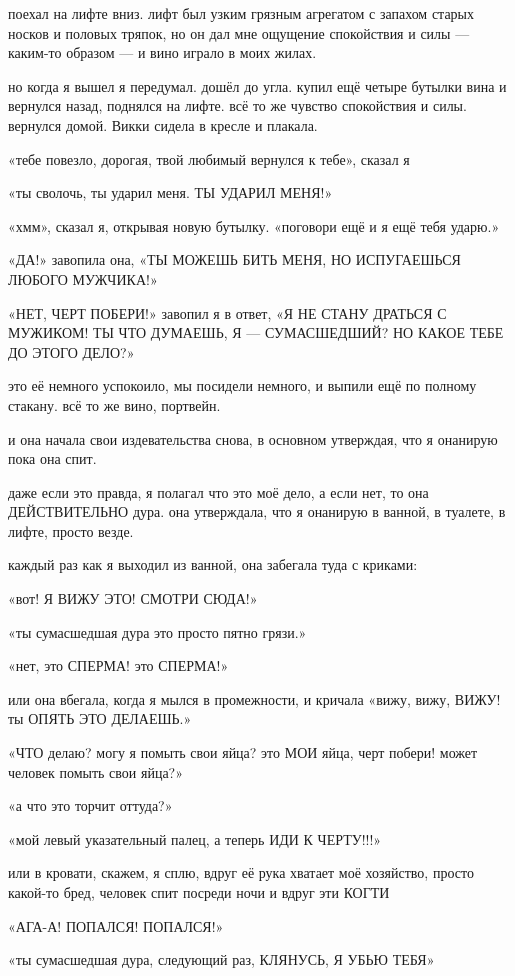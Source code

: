 поехал на лифте вниз.
лифт был узким грязным агрегатом с запахом старых 
носков и половых тряпок, но он дал мне ощущение спокойствия и силы --- каким-то 
образом --- и вино играло в моих жилах.

но когда я вышел я передумал.
дошёл до угла.
купил ещё четыре бутылки вина
и вернулся назад, поднялся на лифте.
всё то же чувство спокойствия и силы.
вернулся домой.
Викки сидела в кресле и плакала.

«тебе повезло, дорогая, твой любимый вернулся к тебе»,  сказал я

«ты сволочь, ты ударил меня.
ТЫ УДАРИЛ МЕНЯ!»

«хмм»,  сказал я, открывая новую бутылку.
«поговори ещё и я ещё тебя ударю.»

«ДА!» завопила она, «ТЫ МОЖЕШЬ БИТЬ МЕНЯ, НО ИСПУГАЕШЬСЯ ЛЮБОГО МУЖЧИКА!»

«НЕТ, ЧЕРТ ПОБЕРИ!» завопил я в ответ, «Я  НЕ  СТАНУ  ДРАТЬСЯ  С МУЖИКОМ! ТЫ  ЧТО ДУМАЕШЬ, Я --- СУМАСШЕДШИЙ?  НО  КАКОЕ ТЕБЕ ДО ЭТОГО ДЕЛО?»

это её немного успокоило, мы посидели немного, и выпили ещё по полному стакану.
всё то же вино, портвейн.

и она начала свои издевательства снова, в основном утверждая, что я онанирую
пока она спит.

даже если это правда, я полагал что это моё дело, а если нет, то она
ДЕЙСТВИТЕЛЬНО дура.
она утверждала, что я онанирую в ванной, в туалете, в 
лифте, просто везде.

каждый раз как я выходил из ванной, она забегала туда с криками:

«вот! Я ВИЖУ ЭТО! СМОТРИ СЮДА!»

«ты сумасшедшая дура это просто пятно грязи.»

«нет, это СПЕРМА! это СПЕРМА!»

или она вбегала, когда я мылся в промежности, и кричала «вижу, вижу, ВИЖУ! ты 
ОПЯТЬ ЭТО ДЕЛАЕШЬ.»

«ЧТО делаю? могу я помыть свои яйца? это МОИ яйца, черт побери! может
человек помыть свои яйца?»

«а что это торчит оттуда?»

«мой левый указательный палец, а теперь ИДИ К ЧЕРТУ!!!»

или в кровати, скажем, я сплю, вдруг её рука хватает моё хозяйство, 
просто какой-то бред, человек спит посреди ночи и вдруг эти КОГТИ

«АГА-А! ПОПАЛСЯ! ПОПАЛСЯ!»

«ты сумасшедшая дура, следующий раз, КЛЯНУСЬ, Я УБЬЮ ТЕБЯ»

